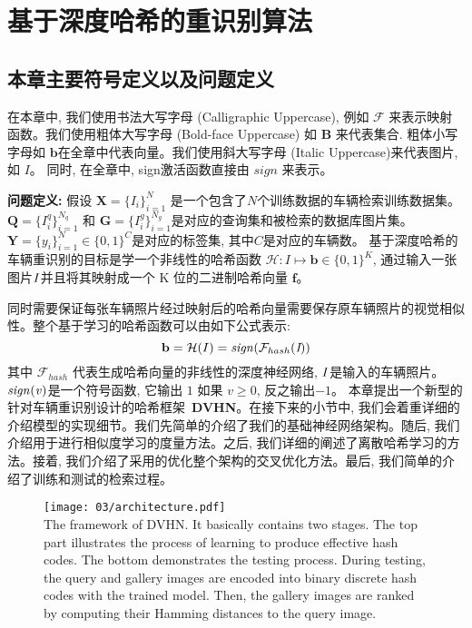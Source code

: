 \section{基于深度哈希的重识别算法}
\subsection{本章主要符号定义以及问题定义}
在本章中, 我们使用书法大写字母 (Calligraphic Uppercase), 例如 $\mathcal{F}$ 来表示映射函数。我们使用粗体大写字母 (Bold-face Uppercase) 如 $\mathbf{B}$ 来代表集合. 粗体小写字母如 $\mathbf{b}$在全章中代表向量。我们使用斜大写字母 (Italic Uppercase)来代表图片, 如 $\textit{I}$。 同时, 在全章中, sign激活函数直接由 $\textit{sign}$ 来表示。\par
\textbf{问题定义:} 假设 $\mathbf{X} = \{\textit{I}_i\}^N_{i=1}$ 是一个包含了$N$个训练数据的车辆检索训练数据集。 $\mathbf{Q} = \{I_i^q\}^{N_{q}}_{i=1}$ 和 $\mathbf{G} = \{I^g_i\}^{N_{g}}_{i=1}$是对应的查询集和被检索的数据库图片集。$\mathbf{Y} = \{\textit{y}_i\}^N_{i=1} \in \{0,1\}^C$是对应的标签集, 其中$C$是对应的车辆数。 基于深度哈希的车辆重识别的目标是学一个非线性的哈希函数 $\mathcal{H}: I \mapsto \mathbf{b} \in \{0,1\}^K $, 通过输入一张图片$\it{I}$并且将其映射成一个 K 位的二进制哈希向量 
$\mathbf{f}$。

同时需要保证每张车辆照片经过映射后的哈希向量需要保存原车辆照片的视觉相似性。整个基于学习的哈希函数可以由如下公式表示:
\begin{equation*}
    \mathbf{b}  = \mathcal{H}(I) = \mathbf{\it{sign}} (\mathcal{F}_{hash}(\textit{I})) 
\end{equation*}
其中 $\mathcal{F}_{hash}$ 代表生成哈希向量的非线性的深度神经网络, $\it{I}$是输入的车辆照片。 $\mathbf{\it{sign}(v)}$是一个符号函数, 它输出 $1$ 如果 $v \geq 0$, 反之输出$-1$。
本章提出一个新型的针对车辆重识别设计的哈希框架~\textbf{DVHN}。在接下来的小节中, 我们会着重详细的介绍模型的实现细节。我们先简单的介绍了我们的基础神经网络架构。随后, 我们介绍用于进行相似度学习的度量方法。之后, 我们详细的阐述了离散哈希学习的方法。接着, 我们介绍了采用的优化整个架构的交叉优化方法。最后, 我们简单的介绍了训练和测试的检索过程。
\begin{figure}[!htp]
    \centering
    \texttt{[image: 03/architecture.pdf]} \\
      {The framework of DVHN. It basically contains two stages. The top part illustrates the process of learning to produce effective hash codes. The
      bottom demonstrates the testing process. During testing, the query and gallery images are encoded into binary discrete hash codes with the trained model.
      Then, the gallery images are ranked by computing their Hamming distances to the query image.}
   \label{fig:archvehicle}
\end{figure} 
